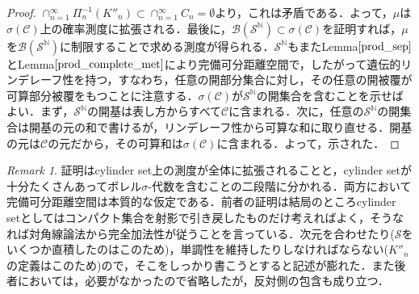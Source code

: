 \documentclass[dvipdfmx,autodetect-engine]{jsarticle}
\theoremstyle{remark}
\newtheorem*{remark}{Remark}
\theoremstyle{definition}
\begin{document}
\begin{proof}
    $\cap_{n=1}^{\infty} \Pi_n^{-1}(K''_n) \subset \cap_{n=1}^{\infty}C_n = \emptyset$より，これは矛盾である．よって，$\mu$は$\sigma(\mathcal{C})$上の確率測度に拡張される．最後に，$\mathcal{B}(\mathcal{S}^{\mathbb{N}}) \subset \sigma(\mathcal{C}) $を証明すれば，$\mu$を$\mathcal{B}(\mathcal{S}^{\mathbb{N}}) $に制限することで求める測度が得られる．$\mathcal{S}^{\mathbb{N}}$もまたLemma$\ref{prod_sep}$とLemma$\ref{prod_complete_met}$により完備可分距離空間で，したがって遺伝的リンデレーフ性を持つ，すなわち，任意の開部分集合に対し，その任意の開被覆が可算部分被覆をもつことに注意する．$\sigma(\mathcal{C})$が$\mathcal{S}^{\mathbb{N}}$の開集合を含むことを示せばよい．まず，$\mathcal{S}^{\mathbb{N}}$の開基は表し方からすべて$\mathcal{C}$に含まれる．次に，任意の$\mathcal{S}^{\mathbb{N}}$の開集合は開基の元の和で書けるが，リンデレーフ性から可算な和に取り直せる．開基の元は$\mathcal{C
    }$の元だから，その可算和は$\sigma(\mathcal{C})$に含まれる．よって，示された．
    \end{proof}
    
    \begin{remark}
    証明はcylinder set上の測度が全体に拡張されることと，cylinder setが十分たくさんあってボレル$\sigma$-代数を含むことの二段階に分かれる．両方において完備可分距離空間は本質的な仮定である．前者の証明は結局のところcylinder setとしてはコンパクト集合を射影で引き戻したものだけ考えればよく，そうなれば対角線論法から完全加法性が従うことを言っている．次元を合わせたり($\mathcal{S}$をいくつか直積したのはこのため)，単調性を維持したりしなければならない($K''_n$の定義はこのため)ので，そこをしっかり書こうとすると記述が膨れた．また後者においては，必要がなかったので省略したが，反対側の包含も成り立つ．
    \end{remark}
    
\end{document}
